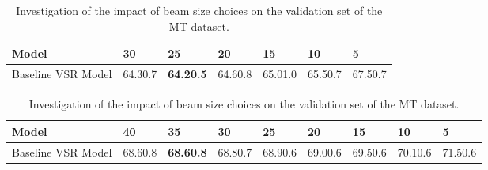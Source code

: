 \documentclass[twocolumn]{article}
\begin{document}
\begin{table*}[!t]
\begin{tabularx}{2\columnwidth}{o  k  k  k  k  k  k  k  k}
\end{tabularx}
\label{tab: ablation_study_french}
\end{table*} \begin{table*}[!t]
\caption{Investigation of the impact of beam size choices on the validation set of the MT dataset.}
\renewcommand\arraystretch{1.05}
\begin{tabularx}{2\columnwidth}{o k  k  k  k  k  k}
\toprule
Model &30 &\bf 25 &20 &15 &10 &5  \\ \midrule
Baseline VSR Model &64.30.7 &\bf 64.20.5 &64.60.8 &65.01.0 &65.50.7 &67.50.7 \\
\bottomrule
\end{tabularx}
\label{tab: ablation_study_italian}
\end{table*} \begin{table*}[!t]
\caption{Investigation of the impact of beam size choices on the validation set of the MT dataset.}
\renewcommand\arraystretch{1.05}
\begin{tabularx}{2\columnwidth}{o  k  k  k  k  k  k  k  k}
\toprule
Model &40 &\bf 35 &30 &25 &20 &15 &10 &5  \\ \midrule
Baseline VSR Model &68.60.8 &\bf 68.60.8 &68.80.7 &68.90.6 &69.00.6 &69.50.6 &70.10.6 &71.50.6
\\
\bottomrule
\end{tabularx}
\label{tab: ablation_study_portuguese}
\end{table*} 
\end{document}
